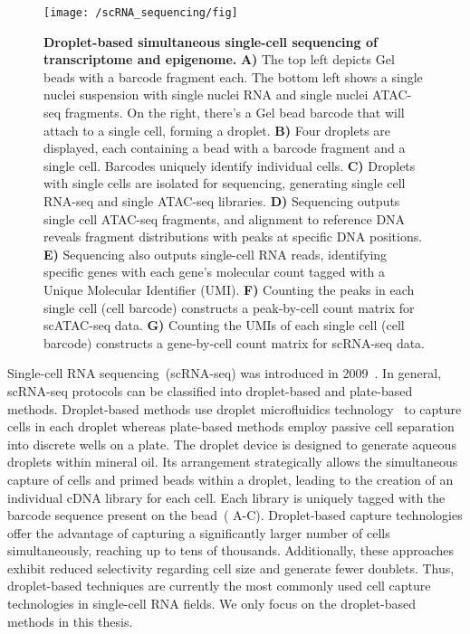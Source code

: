 \begin{figure}[!ht]
	\centering
	\texttt{[image: /scRNA\_sequencing/fig]}
	\vspace{0.1cm}
	\caption[Droplet-based simultaneous single-cell sequencing of transcriptome and epigenome.]{\textbf{Droplet-based simultaneous single-cell sequencing of transcriptome and epigenome.} \textbf{A)} The top left depicts Gel beads with a barcode fragment each. The bottom left shows a single nuclei suspension with single nuclei RNA and single nuclei ATAC-seq fragments. On the right, there's a Gel bead barcode that will attach to a single cell, forming a droplet. \textbf{B)} Four droplets are displayed, each containing a bead with a barcode fragment and a single cell. Barcodes uniquely identify individual cells. \textbf{C)} Droplets with single cells are isolated for sequencing, generating single cell RNA-seq and single ATAC-seq libraries. \textbf{D)} Sequencing outputs single cell ATAC-seq fragments, and alignment to reference DNA reveals fragment distributions with peaks at specific DNA positions. \textbf{E)} Sequencing also outputs single-cell RNA reads, identifying specific genes with each gene's molecular count tagged with a Unique Molecular Identifier (UMI). \textbf{F)} Counting the peaks in each single cell (cell barcode) constructs a peak-by-cell count matrix for scATAC-seq data. \textbf{G)} Counting the UMIs of each single cell (cell barcode) constructs a gene-by-cell count matrix for scRNA-seq data.}
	\label{fig:scRNA_scATAC_to_count_matrix}
\end{figure}

Single-cell RNA sequencing~(scRNA-seq) was introduced in 2009~\citep{tang2009mrna}. In general, scRNA-seq protocols can be classified into droplet-based and plate-based methods. Droplet-based methods use droplet microfluidics technology~\citep{dropletcompare2019, droplet2019practice} to capture cells in each droplet whereas plate-based methods employ passive cell separation into discrete wells on a plate. The droplet device is designed to generate aqueous droplets within mineral oil. Its arrangement strategically allows the simultaneous capture of cells and primed beads within a droplet, leading to the creation of an individual cDNA library for each cell. Each library is uniquely tagged with the barcode sequence present on the bead~( A-C). Droplet-based capture technologies offer the advantage of capturing a significantly larger number of cells simultaneously, reaching up to tens of thousands. Additionally, these approaches exhibit reduced selectivity regarding cell size and generate fewer doublets. Thus, droplet-based techniques are currently the most commonly used cell capture technologies in single-cell RNA fields. We only focus on the droplet-based methods in this thesis.


